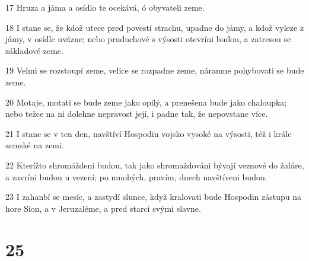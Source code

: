 \par 17 Hruza a jáma a osídlo te ocekává, ó obyvateli zeme.
\par 18 I stane se, že kdož utece pred povestí strachu, upadne do jámy, a kdož vyleze z jámy, v osídle uvázne; nebo pruduchové s výsosti otevríni budou, a zatresou se základové zeme.
\par 19 Velmi se rozstoupí zeme, velice se rozpadne zeme, náramne pohybovati se bude zeme.
\par 20 Motaje, motati se bude zeme jako opilý, a prenešena bude jako chaloupka; nebo težce na ni dolehne nepravost její, i padne tak, že nepovstane více.
\par 21 I stane se v ten den, navštíví Hospodin vojsko vysoké na výsosti, též i krále zemské na zemi.
\par 22 Kterížto shromáždeni budou, tak jako shromaždováni bývají veznové do žaláre, a zavríni budou u vezení; po mnohých, pravím, dnech navštíveni budou.
\par 23 I zahanbí se mesíc, a zastydí slunce, když kralovati bude Hospodin zástupu na hore Sion, a v Jeruzaléme, a pred starci svými slavne.

\chapter{25}

